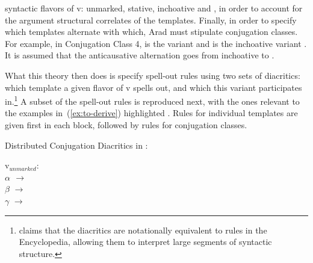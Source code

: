 \begin{exe}
\begin{xlist}
\begin{xlist}
\begin{exe}
\begin{xlist}
\begin{xlist}
\begin{exe}
\begin{xlist}
\begin{xlist}
\begin{exe}
\begin{exe}
\begin{xlist}
\begin{exe}
\begin{exe}
\begin{xlist}
\begin{exe}
\begin{exe}
\begin{exe}
\begin{exe}
\begin{exe}
\begin{xlist}
\begin{exe}
\begin{xlist}
\begin{exe}
\begin{exe}
\begin{xlist}
\begin{exe}
\begin{xlist}
\begin{exe}
\begin{xlist}
\begin{exe}
\begin{exe}
\begin{exe}
\begin{xlist}
\begin{exe}
\begin{exe}
\begin{exe}
\begin{xlist}
\begin{exe}
\begin{xlist}
\begin{exe}
\begin{exe}
\begin{xlist}
\begin{exe}
\begin{exe}
\begin{exe}
\begin{exe}
\begin{xlist}
\begin{exe}
\begin{xlist}
\begin{exe}
\begin{xlist}
\begin{exe}
\begin{xlist}
\begin{exe}
\begin{xlist}
\begin{exe}
\begin{xlist}
\begin{exe}
\begin{exe}
\begin{xlist}
\begin{exe}
\begin{xlist}
\begin{exe}
\begin{exe}
\begin{xlist}
\begin{exe}
\begin{xlist}
\begin{exe}
\begin{exe}
\begin{exe}
\begin{exe}
\begin{xlist}
\begin{xlist}
\begin{exe}
\begin{xlist}
\begin{exe}
\begin{exe}
\begin{exe}
\begin{xlist}
\begin{exe}
\begin{exe}
\begin{xlist}
\begin{exe}
\begin{exe}
\begin{exe}
\begin{xlist}
\begin{xlist}
\begin{exe}
\begin{xlist}
\begin{exe}
\begin{exe}
\begin{exe}
\begin{exe}
\begin{xlist}
\begin{exe}
\begin{xlist}
\begin{exe}
\begin{xlist}
\begin{exe}
\begin{xlist}
\begin{exe}
\begin{exe}
\begin{exe}
\begin{exe}
\begin{exe}
\begin{xlist}
\begin{exe}
\begin{xlist}
\begin{exe}
\begin{xlist}
\begin{xlist}
\begin{exe}
\begin{xlist}
\begin{exe}
\begin{xlist}
\begin{exe}
\begin{xlist}
syntactic flavors of v: unmarked, stative, inchoative and , in order to account for the argument structural correlates of the templates. Finally, in order to specify which templates alternate with which, Arad must stipulate conjugation classes. For example, in Conjugation Class 4, {\tpie} is the  variant and {\thit} is the inchoative variant \citep[220]{arad05}. It is assumed that the anticausative alternation goes from inchoative to .
		
What this theory then does is specify spell-out rules using two sets of diacritics: which template a given flavor of v spells out, and which  this variant participates in.\footnote{\citet[227fn41]{arad05} claims that the diacritics are notationally equivalent to rules in the Encyclopedia, allowing them to interpret large segments of syntactic structure.} A subset of the spell-out rules is reproduced next, with the ones relevant to the examples in~(\ref{ex:to-derive}) highlighted \citep[230--231]{arad05}. Rules for individual templates are given first in each block, followed by rules for conjugation classes.

 \begin{exe}
 \ex  Distributed Conjugation Diacritics in \cite{arad05}: \label{ex:arad-classes} 
 \begin{xlist} 
\begin{multicols}{2}
 	\ex   v$_{unmarked}$: \\
			\textbf{$ \alpha$ $\rightarrow$ {\tkal}} \\
			$\beta$ $\rightarrow$ {\tnif}\\
			$\gamma$ $\rightarrow$ 
\end{multicols}
\end{xlist}
\end{exe}
\end{xlist}
\end{exe}
\end{xlist}
\end{exe}
\end{xlist}
\end{exe}
\end{xlist}
\end{xlist}
\end{exe}
\end{xlist}
\end{exe}
\end{xlist}
\end{exe}
\end{exe}
\end{exe}
\end{exe}
\end{exe}
\end{xlist}
\end{exe}
\end{xlist}
\end{exe}
\end{xlist}
\end{exe}
\end{xlist}
\end{exe}
\end{exe}
\end{exe}
\end{exe}
\end{xlist}
\end{exe}
\end{xlist}
\end{xlist}
\end{exe}
\end{exe}
\end{exe}
\end{xlist}
\end{exe}
\end{exe}
\end{xlist}
\end{exe}
\end{exe}
\end{exe}
\end{xlist}
\end{exe}
\end{xlist}
\end{xlist}
\end{exe}
\end{exe}
\end{exe}
\end{exe}
\end{xlist}
\end{exe}
\end{xlist}
\end{exe}
\end{exe}
\end{xlist}
\end{exe}
\end{xlist}
\end{exe}
\end{exe}
\end{xlist}
\end{exe}
\end{xlist}
\end{exe}
\end{xlist}
\end{exe}
\end{xlist}
\end{exe}
\end{xlist}
\end{exe}
\end{xlist}
\end{exe}
\end{exe}
\end{exe}
\end{exe}
\end{xlist}
\end{exe}
\end{exe}
\end{xlist}
\end{exe}
\end{xlist}
\end{exe}
\end{exe}
\end{exe}
\end{xlist}
\end{exe}
\end{exe}
\end{exe}
\end{xlist}
\end{exe}
\end{xlist}
\end{exe}
\end{xlist}
\end{exe}
\end{exe}
\end{xlist}
\end{exe}
\end{xlist}
\end{exe}
\end{exe}
\end{exe}
\end{exe}
\end{exe}
\end{xlist}
\end{exe}
\end{exe}
\end{xlist}
\end{exe}
\end{exe}
\end{xlist}
\end{xlist}
\end{exe}
\end{xlist}
\end{xlist}
\end{exe}
\end{xlist}
\end{xlist}
\end{exe}
